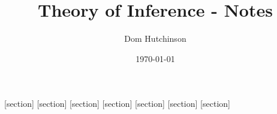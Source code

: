 \documentclass[11pt,a4paper]{article}
\begin{document}
\pagestyle{fancy}
\setlength\parindent{0pt}
\allowdisplaybreaks

\renewcommand{\headrulewidth}{0pt}

\title{Theory of Inference - Notes}
\author{Dom Hutchinson}
\date{\today}
\maketitle

\fancyhead[R]{\today}

[section]
[section]
[section]
[section]
[section]
[section]
[section]

\newcommand{\dotprod}[0]{\boldsymbol{\cdot}}
\newcommand{\cosech}[0]{\mathrm{cosech}\ }
\newcommand{\cosec}[0]{\mathrm{cosec}\ }
\newcommand{\sech}[0]{\mathrm{sech}\ }
\newcommand{\prob}[0]{\mathbb{P}}
\newcommand{\nats}[0]{\mathbb{N}}
\newcommand{\cov}[0]{\mathrm{Cov}}
\newcommand{\var}[0]{\mathrm{Var}}
\newcommand{\expect}[0]{\mathbb{E}}
\newcommand{\reals}[0]{\mathbb{R}}
\newcommand{\integers}[0]{\mathbb{Z}}
\newcommand{\indicator}[0]{\mathds{1}}
\newcommand{\nb}[0]{\textit{N.B.} }
\newcommand{\ie}[0]{\textit{i.e.} }
\newcommand{\eg}[0]{\textit{e.g.} }
\newcommand{\X}[0]{\textbf{X}}
\newcommand{\x}[0]{\textbf{x}}
\newcommand{\iid}[0]{\overset{\text{iid}}{\sim}}
\newcommand{\proved}[0]{$\hfill\square$\\}
\end{document}
